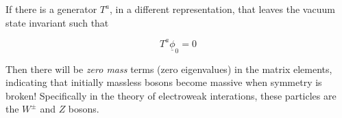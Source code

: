 \noindent If there is a generator $T^a$, in a different representation, that leaves the vacuum state invariant such that

\begin{equation}
T^a \underline{\phi}_0 = 0
\end{equation}

\noindent Then there will be \textit{zero mass} terms (zero eigenvalues) in the matrix elements, indicating that initially massless bosons become massive when symmetry is broken! Specifically in the theory of electroweak interations, these particles are the $W^{\pm}$ and $Z$ bosons.